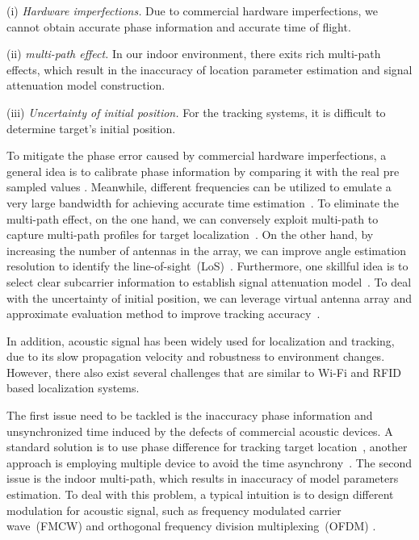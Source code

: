 (i) \emph{Hardware imperfections.} Due to commercial hardware imperfections, we cannot obtain accurate phase information and accurate time of flight.

(ii) \emph{multi-path effect.} In our indoor environment, there exits rich  multi-path effects, which result in the inaccuracy of location parameter estimation and signal attenuation model construction.

(iii) \emph{Uncertainty of initial position.} For the tracking systems, it is difficult to determine target's initial position.


 To mitigate the phase error caused by commercial hardware imperfections, a general idea is to calibrate phase information by comparing it with the real pre sampled values \cite{Wang2016D}. Meanwhile, different frequencies can be utilized to emulate a very large bandwidth for achieving accurate time estimation~\cite{RFind}. To eliminate the multi-path effect, on the one hand, we can conversely exploit multi-path to capture multi-path profiles for target localization~\cite{PinIt}. On the other hand, by increasing the number of antennas in the array, we can improve angle estimation resolution to identify the line-of-sight~(LoS)~\cite{Arraytrack, Spotfi}. Furthermore, one skillful idea is to select clear subcarrier information to establish signal attenuation model~\cite{wang2016lifs}. To deal with the uncertainty of initial position, we can leverage virtual antenna array and approximate evaluation method to improve tracking accuracy~\cite{Tagoram}.

In addition, acoustic signal has been widely used for localization and tracking, due to its slow propagation velocity and robustness to environment changes. However, there also exist several challenges that are similar to Wi-Fi and RFID based localization systems.

The first issue need to be tackled is the inaccuracy phase information and unsynchronized time induced by the defects of commercial acoustic devices. A standard solution is to use phase difference for tracking target location~\cite{LLAP}, another approach is employing multiple device to avoid the time asynchrony~\cite{BeepBeep}.  The second issue is the indoor multi-path, which results in inaccuracy of model parameters estimation. To deal with this problem, a typical intuition is to design different modulation for acoustic signal, such as frequency modulated carrier wave~(FMCW) and orthogonal frequency division multiplexing~(OFDM) \cite{CAT,STRATA}.





